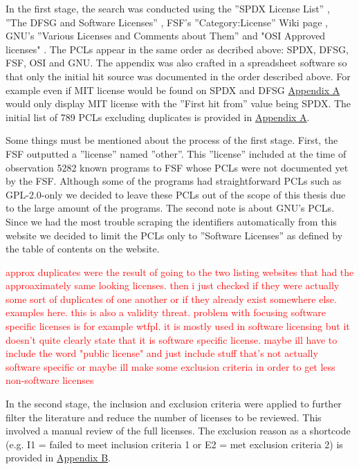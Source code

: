 In the first stage, the search was conducted using the ''SPDX License List'' \citep{spdx:licenses}, ''The DFSG and Software Licenses'' \citep{debian:dfsg}, FSF's ''Category:License'' Wiki page \citep{fsf:licenselist}, GNU's ''Various Licenses and Comments about Them'' \citep{gnu:licenselist} and "OSI Approved licenses" \citep{osi:licenselist}. The PCLs appear in the same order as decribed above: SPDX, DFSG, FSF, OSI and GNU. The appendix was also crafted in a spreadsheet software so that only the initial hit source was documented in the order described above. For example even if MIT license would be found on SPDX and DFSG \hyperref[appendix:a]{Appendix A} would only display MIT license with the ''First hit from'' value being SPDX. The initial list of 789 PCLs excluding duplicates is provided in \hyperref[appendix:a]{Appendix A}. 

Some things must be mentioned about the process of the first stage. First, the FSF outputted a ''license'' named ''other''. This ''license'' included at the time of observation 5282 known programs to FSF whose PCLs were not documented yet by the FSF. Although some of the programs had straightforward PCLs such as GPL-2.0-only we decided to leave these PCLs out of the scope of this thesis due to the large amount of the programs. The second note is about GNU's PCLs. Since we had the most trouble scraping the identifiers automatically from this website we decided to limit the PCLs only to ''Software Licenses'' as defined by the table of contents on the website.

\textcolor{red}{approx duplicates were the result of going to the two listing websites that had the approaximately same looking licenses. then i just checked if they were actually some sort of duplicates of one another or if they already exist somewhere else. examples here. this is also a validity threat. problem with focusing software specific licenses is for example wtfpl. it is mostly used in software licensing but it doesn't quite clearly state that it is software specific license. maybe ill have to include the word "public license" and just include stuff that's not actually software specific or maybe ill make some exclusion criteria in order to get less non-software licenses}

In the second stage, the inclusion and exclusion criteria were applied to further filter the literature and reduce the number of licenses to be reviewed. This involved a manual review of the full licenses. The exclusion reason as a shortcode (e.g. I1 = failed to meet inclusion criteria 1 or E2 = met exclusion criteria 2) is provided in \hyperref[appendix:b]{Appendix B}.

